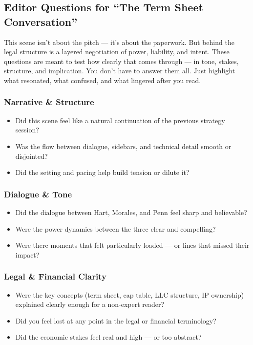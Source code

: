 \subsection{Editor Questions for ``The Term Sheet Conversation''}

This scene isn’t about the pitch — it’s about the paperwork. But behind the legal structure is a layered negotiation of power, liability, and intent. These questions are meant to test how clearly that comes through — in tone, stakes, structure, and implication. You don’t have to answer them all. Just highlight what resonated, what confused, and what lingered after you read.

\subsubsection{Narrative \& Structure}

\begin{itemize}
  \item Did this scene feel like a natural continuation of the previous strategy session?
  \item Was the flow between dialogue, sidebars, and technical detail smooth or disjointed?
  \item Did the setting and pacing help build tension or dilute it?
\end{itemize}

\subsubsection{Dialogue \& Tone}

\begin{itemize}
  \item Did the dialogue between Hart, Morales, and Penn feel sharp and believable?
  \item Were the power dynamics between the three clear and compelling?
  \item Were there moments that felt particularly loaded — or lines that missed their impact?
\end{itemize}

\subsubsection{Legal \& Financial Clarity}

\begin{itemize}
  \item Were the key concepts (term sheet, cap table, LLC structure, IP ownership) explained clearly enough for a non-expert reader?
  \item Did you feel lost at any point in the legal or financial terminology?
  \item Did the economic stakes feel real and high — or too abstract?
\end{itemize}

